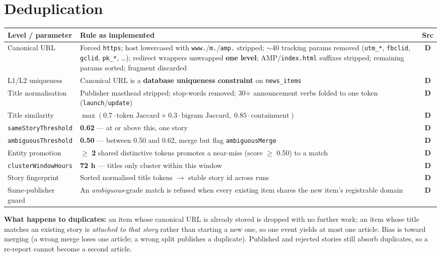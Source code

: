 \documentclass[10pt,a4paper]{article}
\newcommand{\cd}[1]{\texttt{\footnotesize\hyphenpenalty=0\exhyphenpenalty=0\relax #1}}
\newcommand{\us}{\_\discretionary{}{}{}}
\newcommand{\D}{\textcolor{go}{\textbf{D}}}
\begin{document}
\section{Deduplication}

\begin{center}\footnotesize
\begin{tabularx}{\textwidth}{@{}>{\RaggedRight}p{3.2cm} >{\RaggedRight}X c@{}}
\toprule
\textbf{Level / parameter} & \textbf{Rule as implemented} & \textbf{Src} \\
\midrule
Canonical URL & Forced \cd{https}; host lowercased with \cd{www.}/\cd{m.}/\cd{amp.} stripped; $\sim$40 tracking params removed (\cd{utm\us *}, \cd{fbclid}, \cd{gclid}, \cd{pk\us *}, \ldots); redirect wrappers unwrapped \textbf{one level}; AMP/\cd{index.html} suffixes stripped; remaining params sorted; fragment discarded & \D \\
L1/L2 uniqueness & Canonical URL is a \textbf{database uniqueness constraint} on \cd{news\us items} & \D \\
Title normalisation & Publisher masthead stripped; stop-words removed; 30+ announcement verbs folded to one token (\cd{launch}/\cd{update}) & \D \\
Title similarity & $\max(0.7 \cdot \text{token Jaccard} + 0.3 \cdot \text{bigram Jaccard},\; 0.85 \cdot \text{containment})$ & \D \\
\cd{sameStoryThreshold} & \textbf{0.62} --- at or above this, one story & \D \\
\cd{ambiguousThreshold} & \textbf{0.50} --- between 0.50 and 0.62, merge but flag \cd{ambiguousMerge} & \D \\
Entity promotion & $\geq$ \textbf{2} shared distinctive tokens promotes a near-miss (score $\geq$ 0.50) to a match & \D \\
\cd{clusterWindowHours} & \textbf{72 h} --- titles only cluster within this window & \D \\
Story fingerprint & Sorted normalised title tokens $\rightarrow$ stable story id across runs & \D \\
Same-publisher guard & An \emph{ambiguous}-grade match is refused when every existing item shares the new item's registrable domain & \D \\
\bottomrule
\end{tabularx}
\end{center}

\begin{note}\footnotesize
\textbf{What happens to duplicates:} an item whose canonical URL is already stored is dropped with no further work; an item whose title matches an existing story is \emph{attached to that story} rather than starting a new one, so one event yields at most one article. Bias is toward merging (a wrong merge loses one article; a wrong split publishes a duplicate). Published and rejected stories still absorb duplicates, so a re-report cannot become a second article.
\end{note}
\end{document}
